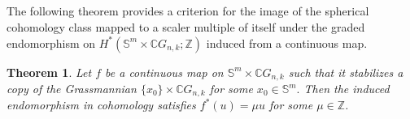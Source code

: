 \documentclass{amsart}
\newtheorem{theorem}{Theorem}[section]
\begin{document}
	\subsection{} The following theorem provides %
a criterion for the image of the spherical cohomology class mapped to a scaler multiple of itself under the graded endomorphism on
	$H^*(\mathbb{S}^m \times \mathbb{C}G_{n,k};\mathbb Z)$ induced from a continuous map.
	
	
	
	\begin{theorem}\label{ind from top}
		Let $f$ be a continuous map on $\mathbb S^m\times \mathbb CG_{n,k}$ such that it stabilizes a %
copy of the Grassmannian %
$\{{x_0}\}\times \mathbb CG_{n,k}$ for some $x_0\in \mathbb S^m.$ Then the induced endomorphism in cohomology satisfies $f^*(u) = \mu u$ for some $\mu \in \mathbb Z$.
	\end{theorem}
	
	
	
\end{document}

